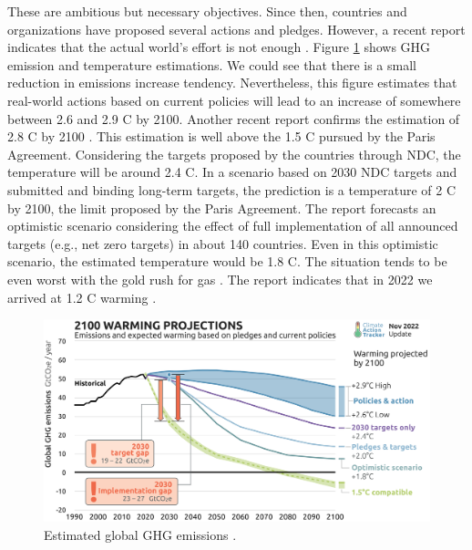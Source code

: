 These are ambitious but necessary objectives. Since then, countries and organizations have proposed several actions and pledges. However, a recent report indicates that the actual world's effort is not enough \cite{tracker2022projections}. Figure \ref{fig:ghg_cat} shows GHG emission and temperature estimations. We could see that there is a small reduction in emissions increase tendency. Nevertheless, this figure estimates that real-world actions based on current policies will lead to an increase of somewhere between 2.6 and 2.9 \degree C by 2100. Another recent report confirms the estimation of 2.8 \degree C by 2100 \cite{lee2023ar6}. This estimation is well above the 1.5 \degree C pursued by the Paris Agreement. Considering the targets proposed by the countries through NDC, the temperature will be around 2.4 \degree C. In a scenario based on 2030 NDC targets and submitted and binding long-term targets, the prediction is a temperature of 2 \degree C by 2100, the limit proposed by the Paris Agreement. The report forecasts an optimistic scenario considering the effect of full implementation of all announced targets (e.g., net zero targets) in about 140 countries. Even in this optimistic scenario, the estimated temperature would be 1.8 \degree C. The situation tends to be even worst with the gold rush for gas \cite{tracker2022massive}. The report indicates that in 2022 we arrived at 1.2 \degree C warming \cite{tracker2022projections}.

\begin{figure}[!htb]
    \centering
    \includegraphics[scale=0.09]{Images/Related_works/Emissions_2022-11.png}
    \caption[Estimated global GHG emissions.]{Estimated global GHG emissions \cite{tracker2022projections}.}
    \label{fig:ghg_cat}
\end{figure}

